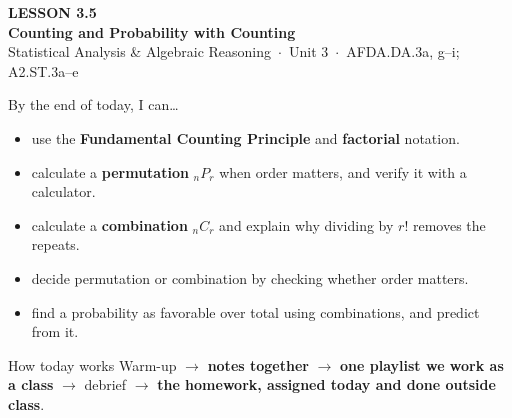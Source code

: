 \documentclass[aspectratio=169, 11pt]{beamer}
\newcommand{\Pnr}[2]{{}_{#1}P_{#2}}
\newcommand{\Cnr}[2]{{}_{#1}C_{#2}}
\begin{document}
{
\begin{frame}[plain]
  \vspace{2.8cm}\hspace{0.55cm}%
  \begin{minipage}{0.9\textwidth}
    {\color{goldacc}\bfseries\small LESSON 3.5}\\[0.5cm]
    {\color{white}\bfseries\LARGE Counting and Probability with Counting}\\[1.2cm]
    {\color{frostmid}\small Statistical Analysis \& Algebraic Reasoning~$\cdot$~Unit 3~$\cdot$~AFDA.DA.3a, g--i; A2.ST.3a--e}
  \end{minipage}
\end{frame}
}

\begin{frame}[t, plain]
  By the end of today, I can\ldots
  \begin{itemize}\setlength{\itemsep}{3pt}
    \item use the \textbf{Fundamental Counting Principle} and \textbf{factorial} notation.
    \item calculate a \textbf{permutation} $\Pnr{n}{r}$ when order matters, and verify it with a calculator.
    \item calculate a \textbf{combination} $\Cnr{n}{r}$ and explain why dividing by $r!$ removes the repeats.
    \item decide permutation or combination by checking whether order matters.
    \item find a probability as favorable over total using combinations, and predict from it.
  \end{itemize}
  \begin{block}{How today works}
    Warm-up $\to$ \textbf{notes together} $\to$ \textbf{one playlist we work as a class} $\to$
    debrief $\to$ \textbf{the homework, assigned today and done outside class}.
  \end{block}
\end{frame}
\end{document}
